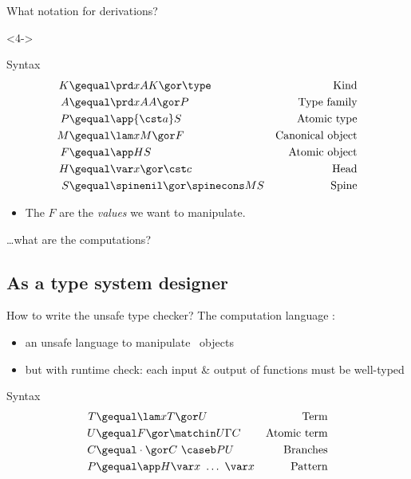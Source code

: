 \begin{frame}{What notation for derivations?}
  \begin{onlyenv}<4->
    \begin{block}{Syntax}
      \vspace{-1.5em}
  \begin{align*}
    K &\gequal \prd x A K \gor \type &
    \text{Kind}\\
    A &\gequal \prd x A A \gor P &
    \text{Type family} \\
    P &\gequal \app {\cst a} S &
    \text{Atomic type} \\
    M &\gequal \lam x M \gor F &
    \text{Canonical object} \\
    F &\gequal \app H S &
    \text{Atomic object} \\
    H &\gequal \var x \gor \cst c &
    \text{Head}\\
    S &\gequal \spinenil \gor \spinecons M S &
    \text{Spine}\\
  \end{align*}
    \end{block}
    \begin{itemize}
    \item The $F$ are the \emph{values} we want to manipulate.
    \end{itemize}
  \end{onlyenv}
    \pause\pause\pause
    \flushright \ldots \small what are the computations?

\end{frame}

\subsection{As a type system designer}

\begin{frame}{How to write the unsafe type checker?}
  The computation language \CL:
  \begin{itemize}
  \item an unsafe language to manipulate \LF\ objects
  \item but with runtime check: each input \& output of functions must be well-typed
  \end{itemize}

  \begin{block}{Syntax}
    \vspace{-1.5em}
  \begin{align*}
    T &\gequal \lam x T \gor
    U & \text{Term} \\
    U &\gequal F \gor
    \matchin U \Gamma C & \text{Atomic term}\\
    C &\gequal \cdot \gor
    C\ \caseb P U & \text{Branches}\\
    P &\gequal \app H {\var x}\ \ldots\ {\var x} &\text{Pattern}
  \end{align*}
  \end{block}
\end{frame}

